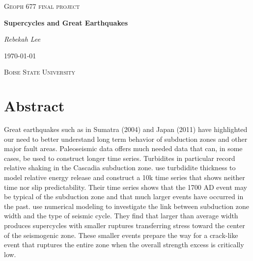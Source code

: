 \documentclass[]{proposalnsf}
\begin{document}
\begin{titlepage}

	\centering
	{\scshape\large Geoph 677 final project\par}
	\vspace{3cm}
	{\huge\bfseries Supercycles and Great Earthquakes\par}
	\vspace{2cm}
	{\Large\itshape Rebekah Lee\par}
	\vspace{.5cm}
	{\large \today\par}

	\vfill
	{\scshape\Large Boise State University \par}
	
\end{titlepage}


\clearpage
\setcounter{page}{1}

\section*{Abstract}

Great earthquakes such as in Sumatra (2004) and Japan (2011) have highlighted our need to better understand long term behavior of subduction zones and other major fault areas. Paleoseismic data offers much needed data that can, in some cases, be used to construct longer time series. Turbidites in particular record relative shaking in the Cascadia subduction zone. \citet{Goldfinger2013} use turbdidite thickness to model relative energy release and construct a 10k time series that shows neither time nor slip predictability. Their time series shows that the 1700 AD event may be typical of the subduction zone and that much larger events have occurred in the past. \citet{Herrendorfer2015} use numerical modeling to investigate the link between subduction zone width and the type of seismic cycle. They find that larger than average width produces supercycles with smaller ruptures transferring stress toward the center of the seismogenic zone. These smaller events prepare the way for a crack-like event that ruptures the entire zone when the overall strength excess is critically low.
\end{document}
